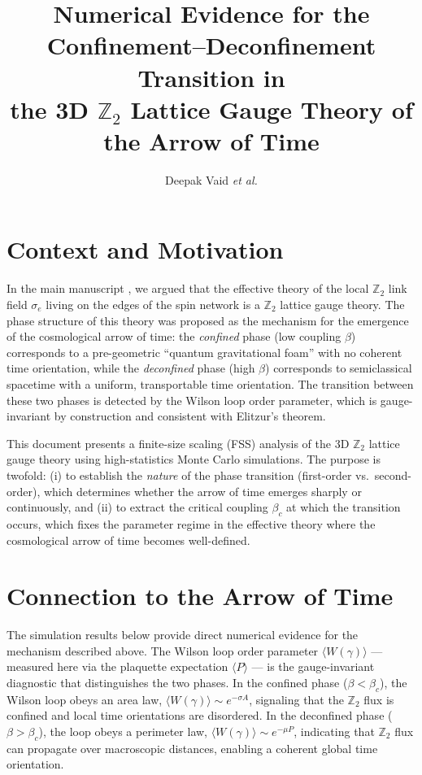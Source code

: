 \documentclass{article}
\begin{document}
\title{Numerical Evidence for the Confinement--Deconfinement Transition in \\
the 3D $\mathbb{Z}_2$ Lattice Gauge Theory of the Arrow of Time}
\author{Deepak Vaid \textit{et al.}}
\date{}
\maketitle

\section{Context and Motivation}
\label{sec:context}

In the main manuscript \cite{Vaid2024Gauging}, we argued that the effective theory of the local $\mathbb{Z}_2$ link field $\sigma_e$ living on the edges of the spin network is a $\mathbb{Z}_2$ lattice gauge theory. The phase structure of this theory was proposed as the mechanism for the emergence of the cosmological arrow of time: the \emph{confined} phase (low coupling $\beta$) corresponds to a pre-geometric ``quantum gravitational foam'' with no coherent time orientation, while the \emph{deconfined} phase (high $\beta$) corresponds to semiclassical spacetime with a uniform, transportable time orientation. The transition between these two phases is detected by the Wilson loop order parameter, which is gauge-invariant by construction and consistent with Elitzur's theorem.

This document presents a finite-size scaling (FSS) analysis of the 3D $\mathbb{Z}_2$ lattice gauge theory using high-statistics Monte Carlo simulations. The purpose is twofold: (i) to establish the \emph{nature} of the phase transition (first-order vs.\ second-order), which determines whether the arrow of time emerges sharply or continuously, and (ii) to extract the critical coupling $\beta_c$ at which the transition occurs, which fixes the parameter regime in the effective theory where the cosmological arrow of time becomes well-defined.

\section{Connection to the Arrow of Time}
\label{sec:arrow-time}

The simulation results below provide direct numerical evidence for the mechanism described above. The Wilson loop order parameter $\langle W(\gamma) \rangle$ --- measured here via the plaquette expectation $\langle P \rangle$ --- is the gauge-invariant diagnostic that distinguishes the two phases. In the confined phase ($\beta < \beta_c$), the Wilson loop obeys an area law, $\langle W(\gamma) \rangle \sim e^{-\sigma A}$, signaling that the $\mathbb{Z}_2$ flux is confined and local time orientations are disordered. In the deconfined phase ($\beta > \beta_c$), the loop obeys a perimeter law, $\langle W(\gamma) \rangle \sim e^{-\mu P}$, indicating that $\mathbb{Z}_2$ flux can propagate over macroscopic distances, enabling a coherent global time orientation.
\end{document}
